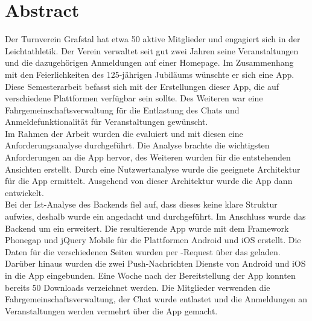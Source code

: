%
%

\thispagestyle{empty}



\newpage
\thispagestyle{empty}
\chapter*{Abstract}\label{abstract}
Der Turnverein Grafstal hat etwa 50 aktive Mitglieder und engagiert sich in der Leichtathletik. Der Verein verwaltet seit gut zwei Jahren seine Veranstaltungen und die dazugehörigen Anmeldungen auf einer Homepage. Im Zusammenhang mit den Feierlichkeiten des 125-jährigen Jubiläums wünschte er sich eine App.\\

Diese Semesterarbeit befasst sich mit der Erstellungen dieser App, die auf verschiedene Plattformen verfügbar sein sollte. Des Weiteren war eine Fahrgemeinschaftsverwaltung für die Entlastung des Chats und Anmeldefunktionalität für Veranstaltungen gewünscht.\\

Im Rahmen der Arbeit wurden die  evaluiert und mit diesen eine Anforderungsanalyse durchgeführt. Die Analyse brachte die wichtigsten Anforderungen an die App hervor, des Weiteren wurden  für die entstehenden Ansichten erstellt. Durch eine Nutzwertanalyse wurde die geeignete Architektur für die App ermittelt. Ausgehend von dieser Architektur wurde die App dann entwickelt.\\

Bei der Ist-Analyse des Backends fiel auf, dass dieses keine klare Struktur aufwies, deshalb wurde ein  angedacht und durchgeführt. Im Anschluss wurde das Backend um ein   erweitert. Die resultierende App wurde mit dem Framework Phonegap und jQuery Mobile für die Plattformen Android und iOS erstellt. Die Daten für die verschiedenen Seiten wurden per -Request über das   geladen. Darüber hinaus wurden die zwei Push-Nachrichten Dienste von Android und iOS in die App eingebunden. Eine Woche nach der Bereitstellung der App konnten bereits 50 Downloads verzeichnet werden. Die Mitglieder verwenden die Fahrgemeinschaftsverwaltung, der Chat wurde entlastet und die Anmeldungen an Veranstaltungen werden vermehrt über die App gemacht.

